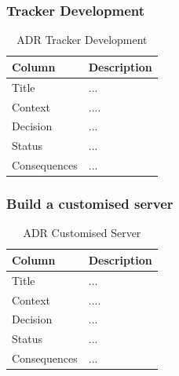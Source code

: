 \documentclass[12pt,a4paper]{article}
\begin{document}
\begin{appendices}
          \subsubsection{Tracker Development}
            \begin{table}[H]
              \centering
                \begin{tabularx}{\textwidth}{l X}
                  \hline
                  Column & Description  \\ \hline
                  Title & ... \\ 
                  Context & ....  \\ 
                  Decision & ...  \\ 
                  Status & ... \\ 
                  Consequences & ... \\                  
                  \hline
                \end{tabularx}
                \caption[Table caption text]{ADR Tracker Development}
                \label{table:ADR Tracker Development}
            \end{table}

          \subsubsection{Build a customised server}
            \begin{table}[H]
              \centering
                \begin{tabularx}{\textwidth}{l X}
                  \hline
                  Column & Description  \\ \hline
                  Title & ... \\ 
                  Context & ....  \\ 
                  Decision & ...  \\ 
                  Status & ... \\ 
                  Consequences & ... \\                  
                  \hline
                \end{tabularx}
                \caption[Table caption text]{ADR Customised Server}
                \label{table:ADR Customised Server}
            \end{table}


\end{appendices}
\end{document}
